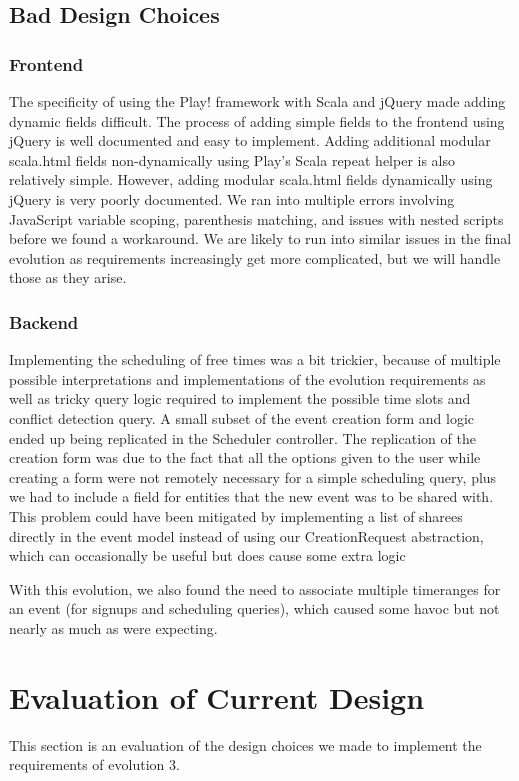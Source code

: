 \documentclass{article}
\begin{document}
\subsection{Bad Design Choices}
\subsubsection{Frontend}
The specificity of using the Play! framework with Scala and jQuery made adding dynamic fields difficult. The process of adding simple fields to the frontend using jQuery is well documented and easy to implement. Adding additional modular scala.html fields non-dynamically using Play’s Scala repeat helper is also relatively simple. However, adding modular scala.html fields dynamically using jQuery is very poorly documented. We ran into multiple errors involving JavaScript variable scoping, parenthesis matching, and issues with nested scripts before we found a workaround. We are likely to run into similar issues in the final evolution as requirements increasingly get more complicated, but we will handle those as they arise.

\subsubsection{Backend}

Implementing the scheduling of free times was a bit trickier, because of multiple possible interpretations and implementations of the evolution requirements as well as tricky query logic required to implement the possible time slots and conflict detection query. A small subset of the event creation form and logic ended up being replicated in the Scheduler controller. The replication of the creation form was due to the fact that all the options given to the user while creating a form were not remotely necessary for a simple scheduling query, plus we had to include a field for entities that the new event was to be shared with. This problem could have been mitigated by implementing a list of sharees directly in the event model instead of using our CreationRequest abstraction, which can occasionally be useful but does cause some extra logic

With this evolution, we also found the need to associate multiple timeranges for an event (for signups and scheduling queries), which caused some havoc but not nearly as much as were expecting.

\section{Evaluation of Current Design}
This section is an evaluation of the design choices we made to implement the requirements of evolution 3.
\end{document}
